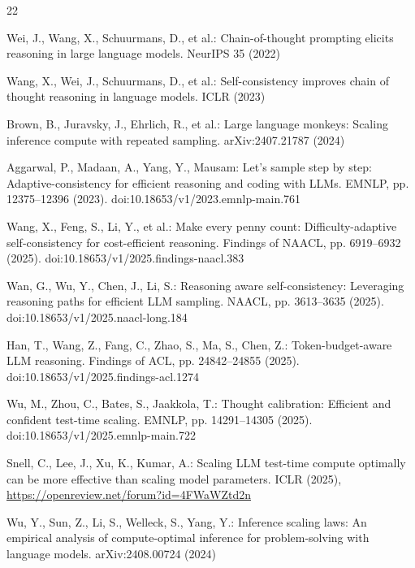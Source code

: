 \documentclass[runningheads]{llncs}
\begin{document}
{\scriptsize
\begin{thebibliography}{22}
\enlargethispage{6\baselineskip}
\setlength{\itemsep}{-1pt}
\setlength{\parsep}{0pt}

Wei, J., Wang, X., Schuurmans, D., et al.: Chain-of-thought prompting elicits
reasoning in large language models. NeurIPS 35 (2022)

Wang, X., Wei, J., Schuurmans, D., et al.: Self-consistency improves chain of
thought reasoning in language models. ICLR (2023)

Brown, B., Juravsky, J., Ehrlich, R., et al.: Large language monkeys: Scaling
inference compute with repeated sampling. arXiv:2407.21787 (2024)

Aggarwal, P., Madaan, A., Yang, Y., Mausam: Let's sample step by step:
Adaptive-consistency for efficient reasoning and coding with LLMs. EMNLP,
pp. 12375--12396 (2023).
doi:10.18653/v1/2023.emnlp-main.761

Wang, X., Feng, S., Li, Y., et al.: Make every penny count:
Difficulty-adaptive self-consistency for cost-efficient reasoning. Findings of
NAACL, pp. 6919--6932 (2025).
doi:10.18653/v1/2025.findings-naacl.383

Wan, G., Wu, Y., Chen, J., Li, S.: Reasoning aware self-consistency:
Leveraging reasoning paths for efficient LLM sampling. NAACL, pp. 3613--3635
(2025). doi:10.18653/v1/2025.naacl-long.184

Han, T., Wang, Z., Fang, C., Zhao, S., Ma, S., Chen, Z.: Token-budget-aware
LLM reasoning. Findings of ACL, pp. 24842--24855 (2025).
doi:10.18653/v1/2025.findings-acl.1274

Wu, M., Zhou, C., Bates, S., Jaakkola, T.: Thought calibration: Efficient and
confident test-time scaling. EMNLP, pp. 14291--14305
(2025). doi:10.18653/v1/2025.emnlp-main.722

Snell, C., Lee, J., Xu, K., Kumar, A.: Scaling LLM test-time compute optimally
can be more effective than scaling model parameters. ICLR (2025),
\url{https://openreview.net/forum?id=4FWaWZtd2n}

Wu, Y., Sun, Z., Li, S., Welleck, S., Yang, Y.: Inference scaling laws: An
empirical analysis of compute-optimal inference for problem-solving with
language models. arXiv:2408.00724 (2024)


\end{thebibliography}}
\end{document}
